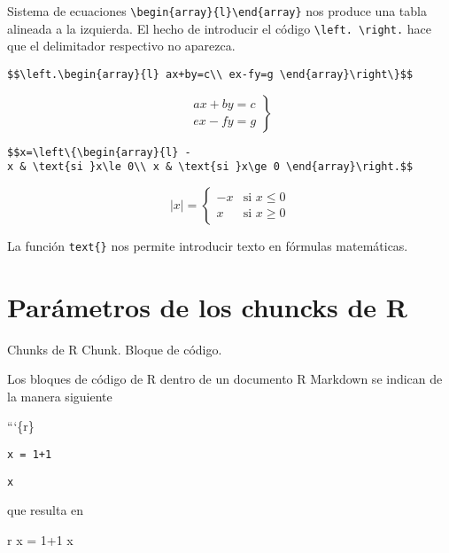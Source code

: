 \documentclass[
  ignorenonframetext,
]{beamer}
\newenvironment{Shaded}{\begin{snugshade}}{\end{snugshade}}
\newcommand{\NormalTok}[1]{#1}
\begin{document}
\begin{frame}[fragile]{Sistema de ecuaciones}
\protect\hypertarget{sistema-de-ecuaciones}{}
\texttt{\textbackslash{}begin\{array\}\{l\}\textbackslash{}end\{array\}}
nos produce una tabla alineada a la izquierda. El hecho de introducir el
código \texttt{\textbackslash{}left.\ \textbackslash{}right.} hace que
el delimitador respectivo no aparezca.

\texttt{\$\$\textbackslash{}left.\textbackslash{}begin\{array\}\{l\}\ ax+by=c\textbackslash{}\textbackslash{}\ ex-fy=g\ \textbackslash{}end\{array\}\textbackslash{}right\textbackslash{}\}\$\$}

\[\left.\begin{array}{l}
ax+by=c\\
ex-fy=g
\end{array}\right\}\]

\texttt{\$\$\textbar{}x\textbar{}=\textbackslash{}left\textbackslash{}\{\textbackslash{}begin\{array\}\{l\}\ -x\ \&\ \textbackslash{}text\{si\ \}x\textbackslash{}le\ 0\textbackslash{}\textbackslash{}\ x\ \&\ \textbackslash{}text\{si\ \}x\textbackslash{}ge\ 0\ \textbackslash{}end\{array\}\textbackslash{}right.\$\$}

\[|x|=\left\{\begin{array}{l}
-x & \text{si }x\le 0\\
x & \text{si }x\ge 0
\end{array}\right.\]

La función \texttt{text\{\}} nos permite introducir texto en fórmulas
matemáticas.
\end{frame}

\hypertarget{paruxe1metros-de-los-chuncks-de-r}{%
\section{Parámetros de los chuncks de
R}\label{paruxe1metros-de-los-chuncks-de-r}}

\begin{frame}[fragile]{Chunks de R}
\protect\hypertarget{chunks-de-r}{}
Chunk. Bloque de código.

Los bloques de código de R dentro de un documento R Markdown se indican
de la manera siguiente

```\{r\}

\texttt{x\ =\ 1+1}

\texttt{x}

\begin{Shaded}
\begin{Highlighting}[]

\NormalTok{que resulta en}


\NormalTok{\textasciigrave{}\textasciigrave{}\textasciigrave{}r}
\NormalTok{x = 1+1}
\NormalTok{x}
\end{Highlighting}
\end{Shaded}
\end{frame}
\end{document}
